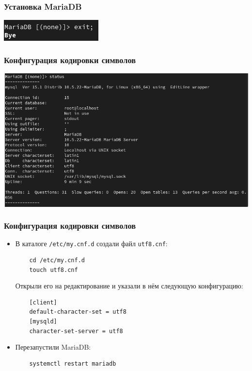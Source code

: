 \begin{frame}
\frametitle{Установка MariaDB}
    \centering
    \includegraphics[width=\textwidth]{../images/image07.png}
\end{frame}

\begin{frame}
\frametitle{Конфигурация кодировки символов}
    \centering
    \includegraphics[width=\textwidth]{../images/image08.png}
\end{frame}

\begin{frame}[containsverbatim]
\frametitle{Конфигурация кодировки символов}
\begin{itemize}
\item В каталоге \texttt{/etc/my.cnf.d} создали файл \texttt{utf8.cnf}:
  \begin{verbatim}
    cd /etc/my.cnf.d
    touch utf8.cnf
  \end{verbatim}
  Открыли его на редактирование и указали в нём следующую конфигурацию:
  \begin{verbatim}
    [client]
    default-character-set = utf8
    [mysqld]
    character-set-server = utf8
  \end{verbatim}
\item Перезапустили MariaDB:
  \begin{verbatim}
    systemctl restart mariadb
  \end{verbatim}
\end{itemize}
\end{frame}

